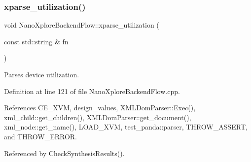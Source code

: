 \mbox{\label{classNanoXploreBackendFlow_ac0920ff76e065f5a1879d7133be5f23f}} 
\subsubsection{\texorpdfstring{xparse\+\_\+utilization()}{xparse\_utilization()}}
{\footnotesize\ttfamily void Nano\+Xplore\+Backend\+Flow\+::xparse\+\_\+utilization (\begin{DoxyParamCaption}\item[{const std\+::string \&}]{fn }\end{DoxyParamCaption})\hspace{0.3cm}{\ttfamily [protected]}}



Parses device utilization. 



Definition at line 121 of file Nano\+Xplore\+Backend\+Flow.\+cpp.



References C\+E\+\_\+\+X\+VM, design\+\_\+values, X\+M\+L\+Dom\+Parser\+::\+Exec(), xml\+\_\+child\+::get\+\_\+children(), X\+M\+L\+Dom\+Parser\+::get\+\_\+document(), xml\+\_\+node\+::get\+\_\+name(), L\+O\+A\+D\+\_\+\+X\+VM, test\+\_\+panda\+::parser, T\+H\+R\+O\+W\+\_\+\+A\+S\+S\+E\+RT, and T\+H\+R\+O\+W\+\_\+\+E\+R\+R\+OR.



Referenced by Check\+Synthesis\+Results().

